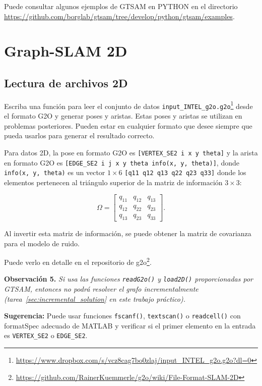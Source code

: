 \documentclass[tp]{lcc}
\begin{document}
Puede consultar algunos ejemplos de GTSAM en PYTHON en el directorio \url{https://github.com/borglab/gtsam/tree/develop/python/gtsam/examples}.

\section{Graph-SLAM 2D}
\subsection{Lectura de archivos 2D}
\label{sec:read_g2o_2d}
Escriba una función para leer el conjunto de datos \lstinline[style=bash]{input_INTEL_g2o.g2o}\footnote{\url{https://www.dropbox.com/s/vcz8cag7bo0zlaj/input_INTEL_g2o.g2o?dl=0}} desde el formato G2O y generar poses y aristas. Estas poses y aristas se utilizan en problemas posteriores. Pueden estar en cualquier formato que desee siempre que pueda usarlos para generar el resultado correcto.

Para datos 2D, la pose en formato G2O es \lstinline[style=bash]{[VERTEX_SE2 i x y theta]} y la arista en formato G2O es \lstinline[style=bash]{[EDGE_SE2 i j x y theta info(x, y, theta)]}, donde \lstinline[style=bash]{info(x, y, theta)} es un vector $1 \times 6$ \lstinline[style=bash]{[q11 q12 q13 q22 q23 q33]} donde los elementos pertenecen al triángulo superior de la matriz de información $3 \times 3$:

\begin{equation*}
    \Omega = \begin{bmatrix} q_{11} & q_{12} & q_{13} \\ q_{12} & q_{22} & q_{23} \\ q_{13} & q_{23} & q_{33} \end{bmatrix}.
\end{equation*}

Al invertir esta matriz de información, se puede obtener la matriz de covarianza para el modelo de ruido.

Puede verlo en detalle en el repositorio de g2o\footnote{\url{https://github.com/RainerKuemmerle/g2o/wiki/File-Format-SLAM-2D}}.

\textbf{Observación 5.} \textit{Si usa las funciones \lstinline[style=bash]{readG2o()} y \lstinline[style=bash]{load2D()} proporcionadas por GTSAM, entonces no podrá resolver el grafo incrementalmente (tarea~\ref{sec:incremental_solution} en este trabajo práctico).}

\textbf{Sugerencia:} Puede usar funciones \lstinline[style=bash]{fscanf()}, \lstinline[style=bash]{textscan()} o \lstinline[style=bash]{readcell()} con formatSpec adecuado de MATLAB y verificar si el primer elemento en la entrada es \lstinline[style=bash]{VERTEX_SE2} o \lstinline[style=bash]{EDGE_SE2}.
\end{document}
